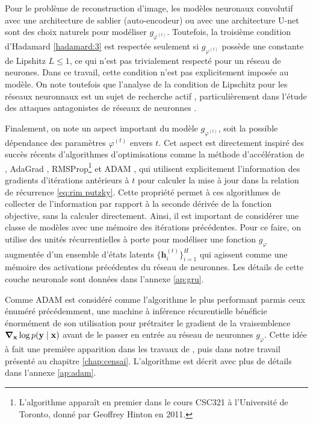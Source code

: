 Pour le problème de reconstruction d'image, les modèles neuronaux convolutif avec une architecture de sablier (auto-encodeur) ou 
avec une architecture U-net \citep{Ronneberger2015} sont des choix naturels pour modéliser $g_{\varphi^{(t)}}$. 
Toutefois, la troisième condition d'Hadamard \ref{hadamard:3} est respectée seulement si $g_{\varphi^{(t)}}$ 
possède une constante de Lipshitz $L\leq 1$, ce qui n'est pas trivialement respecté pour un réseau de neurones.
Dans ce travail, cette condition n'est pas explicitement imposée au modèle. 
On note toutefois que l'analyse de la condition de Lipschitz pour les réseaux neuronnaux est un 
sujet de recherche actif \citep[e.g.][]{}, particulièrement dans l'étude des attaques antagonistes de réseaux de neuronnes \citep[e.g.][]{}. 

Finalement, on note un aspect important du modèle $g_{\varphi^{(t)}}$, soit la possible dépendance des paramètres $\varphi^{(t)}$ envers $t$. Cet aspect 
est directement inspiré des succès récents d'algorithmes d'optimisations comme la méthode d'accélération de \citet{Nesterov1983}, 
AdaGrad \citep{Duchi2011}, RMSProp\footnote{L'algorithme apparaît en premier dans le cours CSC321 à l'Université de Toronto, donné par Geoffrey Hinton en 2011.} \citep{Hinton2012} 
et ADAM \citep{Kingma2014},
qui utilisent explicitement l'information 
des gradients d'itérations antérieurs à $t$ pour calculer la mise à jour dans la relation de récurrence \eqref{eq:rim putzky}.
Cette propriété permet à ces algorithmes de collecter de l'information par rapport à la seconde dérivée de la fonction 
objective, sans la calculer directement.
Ainsi, il est important de considérer une classe de modèles avec une mémoire des itérations précédentes. Pour ce 
faire, on utilise des unités récurrentielles à porte \citep[de l'anglais \textit{gated recurrent units}:][]{Cho2014} 
pour modéliser une fonction $g_{\varphi}$ augmentée d'un ensemble d'états latents $\{\mathbf{h}^{(t)}_i\}_{i=1}^{H}$ 
qui agissent comme une mémoire des activations précédentes du réseau de neuronnes. Les détails 
de cette couche neuronale sont données dans l'annexe \ref{ap:gru}. 

Comme ADAM est considéré comme l'algorithme le plus performant parmis ceux énuméré précédemment, 
une machine à inférence récurentielle bénéficie énormément de son utilisation pour 
prétraiter le gradient de la vraisemblence $\grad_{\mathbf{x}}\log p(\mathbf{y} \mid \mathbf{x})$ 
avant de le passer en entrée au réseau de neuronnes $g_{\varphi}$. 
Cette idée à fait une première apparition dans les travaux de 
\citet{Modi2021}, puis dans notre travail présenté au chapitre \ref{chap:censai}. 
L'algorithme est décrit avec plus de détails dans l'annexe \ref{ap:adam}.



